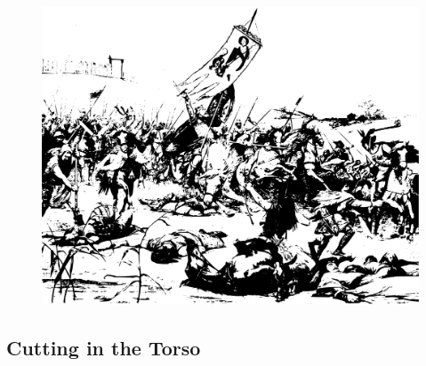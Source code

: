 \documentclass[12pt]{book}  %
\begin{document}
\begin{figure}[h]
    \centering
    \includegraphics[width=\textwidth]{./images/combat06.pdf}
\end{figure}

\subsection{Cutting in the Torso}
\end{document}
